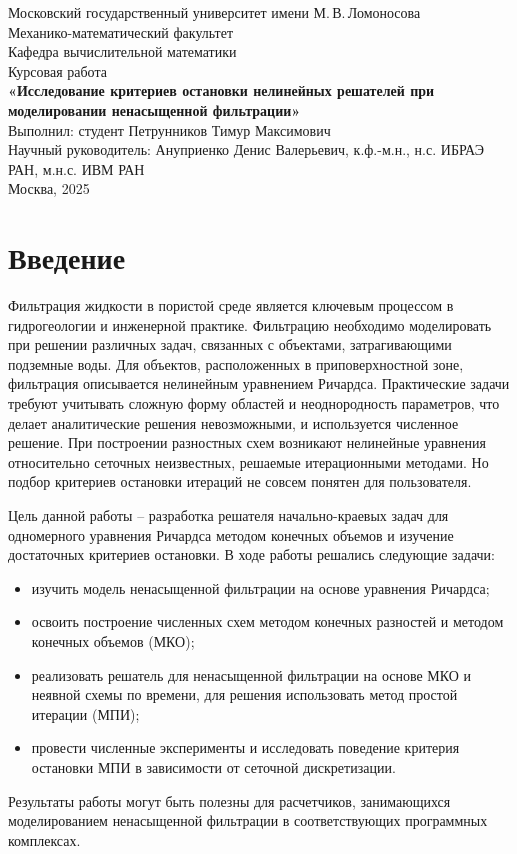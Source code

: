 \documentclass[a4paper,12pt]{article}
\begin{document}
\begin{titlepage}
  \centering
  {\large Московский государственный университет имени М.\,В.\,Ломоносова\\
  Механико-математический факультет\\
  Кафедра вычислительной математики}\\[2cm]

  {\LARGE Курсовая работа}\\[1cm]
  {\Large \textbf{«Исследование критериев остановки нелинейных решателей при моделировании ненасыщенной фильтрации»}}\\[1.5cm]

  {\large Выполнил: студент Петрунников Тимур Максимович\\
  Научный руководитель: Ануприенко Денис Валерьевич, к.ф.-м.н., н.с. ИБРАЭ РАН, м.н.с. ИВМ РАН}\\[2cm]

  Москва, 2025
\end{titlepage}

\tableofcontents
\newpage

\section{Введение}
Фильтрация жидкости в пористой среде является ключевым процессом в гидрогеологии и инженерной практике. Фильтрацию необходимо моделировать при решении различных задач, связанных с объектами, затрагивающими подземные воды. Для объектов, расположенных в приповерхностной зоне, фильтрация описывается нелинейным уравнением Ричардса. Практические задачи требуют учитывать сложную форму областей и неоднородность параметров, что делает аналитические решения невозможными, и используется численное решение. При построении разностных схем возникают нелинейные уравнения относительно сеточных неизвестных, решаемые итерационными методами. Но подбор критериев остановки итераций не совсем понятен для пользователя.

Цель данной работы -- разработка решателя начально-краевых задач для одномерного уравнения Ричардса методом конечных объемов и изучение достаточных критериев остановки. В ходе работы решались следующие задачи:
\begin{itemize}
  \item изучить модель ненасыщенной фильтрации на основе уравнения Ричардса;
  \item освоить построение численных схем методом конечных разностей и методом конечных объемов (МКО);
  \item реализовать решатель для ненасыщенной фильтрации на основе МКО и неявной схемы по времени, для решения использовать метод простой итерации (МПИ);
  \item провести численные эксперименты и исследовать поведение критерия остановки МПИ в зависимости от сеточной дискретизации.
\end{itemize}
Результаты работы могут быть полезны для расчетчиков, занимающихся моделированием ненасыщенной фильтрации в соответствующих программных комплексах.
\end{document}
